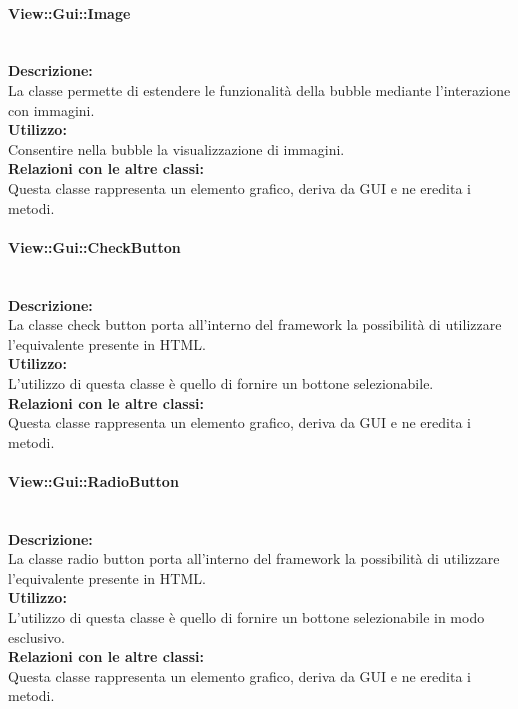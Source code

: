 \paragraph{View\-::Gui\-::Image}\label{gui-image}\mbox{}\\
\textbf{Descrizione:}\\
La classe permette di estendere le funzionalità della bubble mediante l'interazione con immagini.\\
\textbf{Utilizzo:}\\
Consentire nella bubble la visualizzazione di immagini.\\
\textbf{Relazioni con le altre classi:}\\
Questa classe rappresenta un elemento grafico, deriva da GUI e ne eredita i metodi.\\

\paragraph{View\-::Gui\-::Check\-Button}\label{gui-check}\mbox{}\\
\textbf{Descrizione:}\\
La classe check button porta all'interno del framework la possibilità di utilizzare l'equivalente presente in HTML.\\
\textbf{Utilizzo:}\\
L'utilizzo di questa classe è quello di fornire un bottone selezionabile.\\
\textbf{Relazioni con le altre classi:}\\
Questa classe rappresenta un elemento grafico, deriva da GUI e ne eredita i metodi.\\

\paragraph{View\-::Gui\-::Radio\-Button}\label{gui-radio}\mbox{}\\
\textbf{Descrizione:}\\
La classe radio button porta all'interno del framework la possibilità di utilizzare l'equivalente presente in HTML.\\
\textbf{Utilizzo:}\\
L'utilizzo di questa classe è quello di fornire un bottone selezionabile in modo esclusivo.\\
\textbf{Relazioni con le altre classi:}\\
Questa classe rappresenta un elemento grafico, deriva da GUI e ne eredita i metodi.\\

